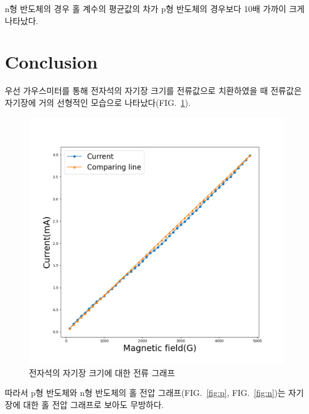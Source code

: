 \documentclass[aps,reprint,superscriptaddress,10pt]{revtex4-2}
\begin{document}
n형 반도체의 경우 홀 계수의 평균값의 차가 p형 반도체의 경우보다 10배 가까이 크게 나타났다.
\section{Conclusion}
우선 가우스미터를 통해 전자석의 자기장 크기를 전류값으로 치환하였을 때 전류값은 자기장에
거의 선형적인 모습으로 나타났다(FIG.~\ref{fig:compare}).
\begin{figure}[htbp]
  \centering
  \includegraphics[scale = 0.3]{compare.png}
  \caption{전자석의 자기장 크기에 대한 전류 그래프}\label{fig:compare}
\end{figure}
따라서 p형 반도체와 n형 반도체의 홀 전압 그래프(FIG.~\ref{fig:p}, FIG.~\ref{fig:n})는
자기장에 대한 홀 전압 그래프로 보아도 무방하다.
\end{document}
